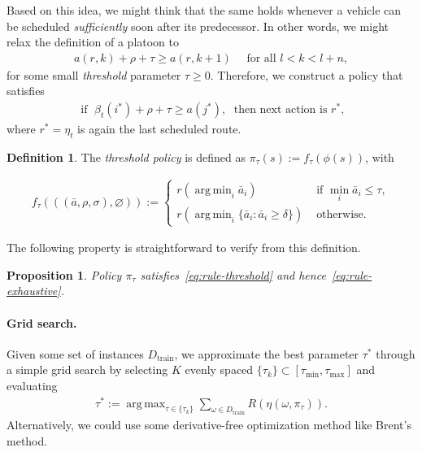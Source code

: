 \documentclass{report}
\theoremstyle{definition}
\newtheorem{define}{Definition}[chapter]
\theoremstyle{plain}
\newtheorem{proposition}{Proposition}[chapter]
\DeclareMathOperator*{\argmax}{arg\,max}
\DeclareMathOperator*{\argmin}{arg\,min}
\begin{document}
Based on this idea, we might think that the same holds whenever a vehicle can be
scheduled \textit{sufficiently} soon after its predecessor.
%
In other words, we might relax the definition of a platoon to
\begin{align*}
  a(r,k) + \rho + \tau \geq a(r, k + 1) \quad \text{ for all } l < k < l + n,
\end{align*}
for some small \emph{threshold} parameter $\tau \geq 0$.
%
Therefore, we construct a policy that satisfies
\begin{align}\label{eq:rule-threshold}\tag{threshold}
  \text{ if } \; \beta_t(i^*) + \rho + \tau \geq a(j^*) , \; \text{ then next action is } r^* ,
\end{align}
where $r^* = \eta_t$ is again the last scheduled route.

\begin{define}
  The \emph{threshold policy} is defined as
  $\pi_\tau(s) := f_\tau(\phi(s))$, with
  
\begin{align}
  f_\tau(((\bar{a}, \rho, \sigma), \varnothing)) := \begin{cases}
    r(\argmin_i \bar{a}_i) & \text{ if } \min_i \bar{a}_i \leq \tau , \\
    r(\argmin_i \{ \bar{a}_i : \bar{a}_i \geq \delta \}) & \text{ otherwise. }
    \end{cases}
\end{align}
\end{define}

The following property is straightforward to verify from this definition.

\begin{proposition}
  Policy $\pi_\tau$ satisfies~\eqref{eq:rule-threshold} and hence~\eqref{eq:rule-exhaustive}.
\end{proposition}

\vspace{-1.4em}

\paragraph{Grid search.}

Given some set of instances $D_\mathrm{train}$, we approximate the best
parameter $\tau^*$ through a simple grid search by selecting $K$ evenly spaced
$\{\tau_k \} \subset [\tau_{\min}, \tau_{\max}]$ and evaluating
\begin{align*}
  \tau^* := \argmax_{\tau \in \{\tau_k\}} \sum_{\omega \in D_\textrm{train}} R(\eta(\omega, \pi_{\tau})) .
\end{align*}
%
Alternatively, we could use some derivative-free optimization method like Brent's method.
\end{document}
